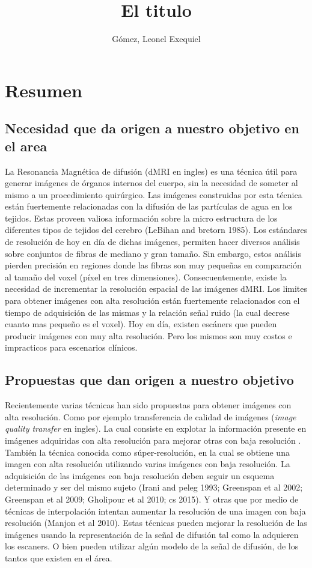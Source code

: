 \documentclass[a4paper,10pt]{article}
\title{El titulo}
\author{Gómez, Leonel Exequiel}
\begin{document}
\maketitle

\section{Resumen}

\subsection{Necesidad que da origen a nuestro objetivo en el area}
La Resonancia Magnética de difusión (dMRI en ingles) es una técnica útil para generar imágenes de 
órganos internos del 
cuerpo, sin la necesidad de someter al mismo a un procedimiento quirúrgico. Las imágenes construidas por esta técnica 
están fuertemente relacionadas con la difusión de las partículas de agua en los tejidos. Estas proveen valiosa 
información sobre la micro estructura de los diferentes tipos de tejidos del cerebro (LeBihan and 
bretorn 1985). Los estándares de resolución de hoy en día de dichas imágenes, permiten hacer 
diversos análisis sobre conjuntos de fibras de mediano y gran tamaño. Sin embargo, estos análisis 
pierden precisión en regiones donde las fibras son muy pequeñas en comparación 
al tamaño del voxel (píxel en tres dimensiones). Consecuentemente, existe la necesidad de 
incrementar la resolución espacial de las imágenes dMRI. Los limites para 
obtener imágenes con alta resolución están fuertemente relacionados con el 
tiempo de adquisición de las mismas y la relación señal ruido (la cual decrese 
cuanto mas pequeño es el voxel). Hoy en día, existen escáners que pueden 
producir imágenes con muy alta resolución. Pero los mismos son muy costos e 
impracticos para escenarios clínicos.


\subsection{Propuestas que dan origen a nuestro objetivo}
Recientemente varias técnicas han sido propuestas para obtener imágenes con alta resolución. Como 
por ejemplo 
transferencia de calidad de imágenes (\textit{image quality transfer} en ingles). La cual 
consiste en explotar la 
información presente en imágenes adquiridas con alta resolución para mejorar otras con baja resolución 
\citep{Alexander2014}. También la técnica conocida como súper-resolución, en 
la cual se obtiene una imagen con alta resolución utilizando varias imágenes con baja resolución. 
La adquisición de las imágenes con baja 
resolución deben seguir un esquema determinado y ser del mismo sujeto (Irani and peleg 1993; Greenspan et al 
2002; Greenspan et al 2009; Gholipour et al 2010; cs 2015). Y otras que por medio de técnicas de interpolación intentan 
aumentar la resolución de una imagen con baja resolución (Manjon et al 2010). Estas técnicas pueden mejorar la 
resolución de las imágenes usando la representación de la señal de difusión tal como la adquieren los escaners. O bien 
pueden utilizar algún modelo de la señal de difusión, de los tantos que existen en el área.
\end{document}
